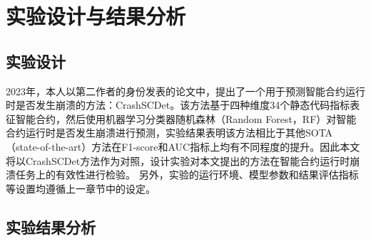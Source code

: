 







\section{实验设计与结果分析}
\label{sec:实验设计与结果分析2}
\subsection{实验设计}
\label{sec:实验设计2}
2023年，本人以第二作者的身份发表的论文\cite{crashscdet}中，提出了一个用于预测智能合约运行时是否发生崩溃的方法：CrashSCDet。该方法基于四种维度34个静态代码指标表征智能合约，然后使用机器学习分类器随机森林（Random Forest，RF）对智能合约运行时是否发生崩溃进行预测，实验结果表明该方法相比于其他SOTA（state-of-the-art）方法在F1-score和AUC指标上均有不同程度的提升。因此本文将以CrashSCDet方法作为对照，设计实验对本文提出的方法在智能合约运行时崩溃任务上的有效性进行检验。
另外，实验的运行环境、模型参数和结果评估指标等设置均遵循上一章节中的设定。
\subsection{实验结果分析}
\label{sec:实验结果分析2}

